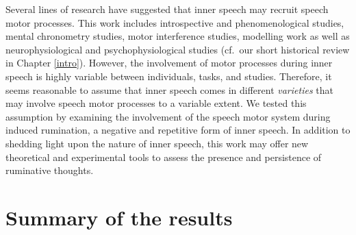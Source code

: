 \documentclass[a4paper,12pt,twoside,onecolumn,openright,final,oldfontcommands]{memoir}
\newcommand{\initial}[1]{
	\lettrine[lines=3,lhang=0.33,nindent=0em]{
		\color{gray}
     		{\textsc{#1}}}{}}
\begin{document}
\initial{S}everal lines of research have suggested that inner speech may recruit speech motor processes. This work includes introspective and phenomenological studies, mental chronometry studies, motor interference studies, modelling work as well as neurophysiological and psychophysiological studies (cf.~our short historical review in Chapter \ref{intro}). However, the involvement of motor processes during inner speech is highly variable between individuals, tasks, and studies. Therefore, it seems reasonable to assume that inner speech comes in different \emph{varieties} that may involve speech motor processes to a variable extent. We tested this assumption by examining the involvement of the speech motor system during induced rumination, a negative and repetitive form of inner speech. In addition to shedding light upon the nature of inner speech, this work may offer new theoretical and experimental tools to assess the presence and persistence of ruminative thoughts.

\hypertarget{summary}{%
\section{Summary of the results}\label{summary}}
\end{document}
